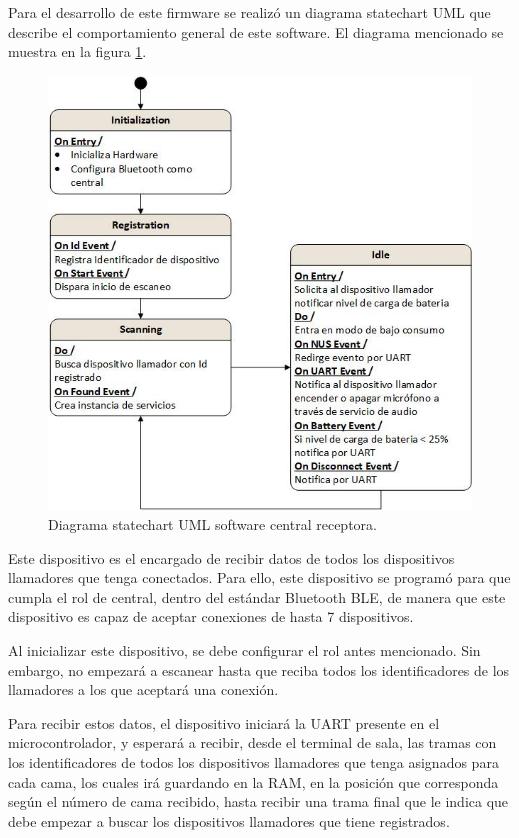 Para el desarrollo de este firmware se realizó un diagrama statechart UML que describe el comportamiento general de este software. El diagrama mencionado se muestra en la figura \ref{fig:DiagramaSoftCentral}.

\begin{figure}[htpb]
	\centering
	\includegraphics[scale=0.8]{./Figures/Dcentral.jpeg}
	\caption{Diagrama statechart UML software central receptora.}
	\label{fig:DiagramaSoftCentral}
\end{figure}

Este dispositivo es el encargado de recibir datos de todos los dispositivos llamadores que tenga conectados. Para ello, este dispositivo se programó para que cumpla el rol de central, dentro del estándar Bluetooth BLE, de manera que este dispositivo es capaz de aceptar conexiones de hasta 7 dispositivos.

Al inicializar este dispositivo, se debe configurar el rol antes mencionado. Sin embargo, no empezará a escanear hasta que reciba todos los identificadores de los llamadores a los que aceptará una conexión.

Para recibir estos datos, el dispositivo iniciará la UART presente en el microcontrolador, y esperará a recibir, desde el terminal de sala, las tramas con los identificadores de todos los dispositivos llamadores que tenga asignados para cada cama, los cuales irá guardando en la RAM, en la posición que corresponda según el número de cama recibido, hasta recibir una trama final que le indica que debe empezar a buscar los dispositivos llamadores que tiene registrados. 

